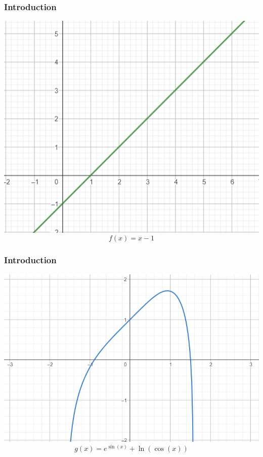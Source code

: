 \documentclass{beamer}
\begin{document}
\begin{frame}
\frametitle{Introduction}

\begin{center}
\includegraphics[scale=0.7]{f(x)=x-1.png} 
\[ f(x) = x - 1 \]
\end{center}

\end{frame}

\begin{frame}
\frametitle{Introduction}

\begin{center}
\includegraphics[scale=0.7]{g(x)=e(sin(x))+ln(cos(x)).png} 
\[ g(x) = e^{\sin(x)} + \ln(\cos(x)) \]
\end{center}

\end{frame}
\end{document}
